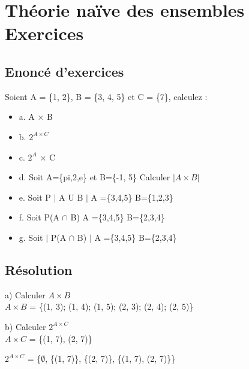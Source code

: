 \newpage

\section{Théorie naïve des ensembles Exercices}
\vspace{5mm} %

\subsection{Enoncé d'exercices}

Soient A = \{1, 2\}, B = \{3, 4, 5\} et C = \{7\}, calculez : \\

\begin{itemize}
\item {a. A × B}
\item {b. $2^{A×C}$}
\item {c. $2^{A}$ × C}
\item {d. Soit A=\{pi,2,e\} et B=\{-1, 5\} Calculer ${|A\times B|}$}
\item {e. Soit P $|$ A U B $|$ A =\{3,4,5\} B=\{1,2,3\}}
\item {f. Soit P(A $\cap$ B)  A =\{3,4,5\} B=\{2,3,4\}}
\item {g. Soit $|$ P(A $\cap$ B) $|$ A =\{3,4,5\} B=\{2,3,4\}}
\end{itemize}

\subsection{Résolution}
\vspace{4mm} %

a) Calculer ${A\times B}$ \\

$A \times B$ = \{(1, 3); (1, 4); (1, 5); (2, 3); (2, 4); (2, 5)\} \\
\vspace{5mm} %

b) Calculer $2^{A×C}$ \\

$A \times C$ = \{(1, 7), (2, 7)\}
\vspace{5mm} %

$2^{A×C}$ = \{$\emptyset$, \{(1, 7)\}, \{(2, 7)\}, \{(1, 7), (2, 7)\}\} \\
\vspace{5mm} %

